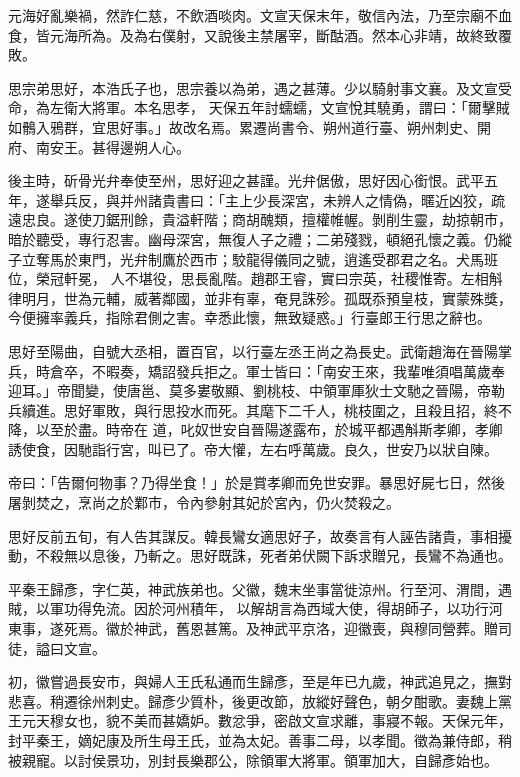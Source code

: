 \begin{pinyinscope}
 元海好亂樂禍，然詐仁慈，不飲酒啖肉。文宣天保末年，敬信內法，乃至宗廟不血食，皆元海所為。及為右僕射，又說後主禁屠宰，斷酤酒。然本心非靖，故終致覆敗。



 思宗弟思好，本浩氏子也，思宗養以為弟，遇之甚薄。少以騎射事文襄。及文宣受命，為左衛大將軍。本名思孝，
 天保五年討蠕蠕，文宣悅其驍勇，謂曰：「爾擊賊如鶻入鴉群，宜思好事。」故改名焉。累遷尚書令、朔州道行臺、朔州刺史、開府、南安王。甚得邊朔人心。



 後主時，斫骨光弁奉使至州，思好迎之甚謹。光弁倨傲，思好因心銜恨。武平五年，遂舉兵反，與并州諸貴書曰：「主上少長深宮，未辨人之情偽，暱近凶狡，疏遠忠良。遂使刀鋸刑餘，貴溢軒階；商胡醜類，擅權帷幄。剝削生靈，劫掠朝市，暗於聽受，專行忍害。幽母深宮，無復人子之禮；二弟殘戮，頓絕孔懷之義。仍縱子立奪馬於東門，光弁制鷹於西市；駮龍得儀同之號，逍遙受郡君之名。犬馬班位，榮冠軒冕，
 人不堪役，思長亂階。趙郡王睿，實曰宗英，社稷惟寄。左相斛律明月，世為元輔，威著鄰國，並非有辜，奄見誅殄。孤既忝預皇枝，實蒙殊獎，今便擁率義兵，指除君側之害。幸悉此懷，無致疑惑。」行臺郎王行思之辭也。



 思好至陽曲，自號大丞相，置百官，以行臺左丞王尚之為長史。武衛趙海在晉陽掌兵，時倉卒，不暇奏，矯詔發兵拒之。軍士皆曰：「南安王來，我輩唯須唱萬歲奉迎耳。」帝聞變，使唐邕、莫多婁敬顯、劉桃枝、中領軍厙狄士文馳之晉陽，帝勒兵續進。思好軍敗，與行思投水而死。其麾下二千人，桃枝圍之，且殺且招，終不降，以至於盡。時帝在
 道，叱奴世安自晉陽遂露布，於城平都遇斛斯孝卿，孝卿誘使食，因馳詣行宮，叫已了。帝大懽，左右呼萬歲。良久，世安乃以狀自陳。



 帝曰：「告爾何物事？乃得坐食！」於是賞孝卿而免世安罪。暴思好屍七日，然後屠剝焚之，烹尚之於鄴市，令內參射其妃於宮內，仍火焚殺之。



 思好反前五旬，有人告其謀反。韓長鸞女適思好子，故奏言有人誣告諸貴，事相擾動，不殺無以息後，乃斬之。思好既誅，死者弟伏闕下訴求贈兄，長鸞不為通也。



 平秦王歸彥，字仁英，神武族弟也。父徽，魏末坐事當徙涼州。行至河、渭間，遇賊，以軍功得免流。因於河州積年，
 以解胡言為西域大使，得胡師子，以功行河東事，遂死焉。徽於神武，舊恩甚篤。及神武平京洛，迎徽喪，與穆同營葬。贈司徒，謚曰文宣。



 初，徽嘗過長安市，與婦人王氏私通而生歸彥，至是年已九歲，神武追見之，撫對悲喜。稍遷徐州刺史。歸彥少質朴，後更改節，放縱好聲色，朝夕酣歌。妻魏上黨王元天穆女也，貌不美而甚嬌妒。數忿爭，密啟文宣求離，事寢不報。天保元年，封平秦王，嫡妃康及所生母王氏，並為太妃。善事二母，以孝聞。徵為兼侍郎，稍被親寵。以討侯景功，別封長樂郡公，除領軍大將軍。領軍加大，自歸彥始也。




\end{pinyinscope}
